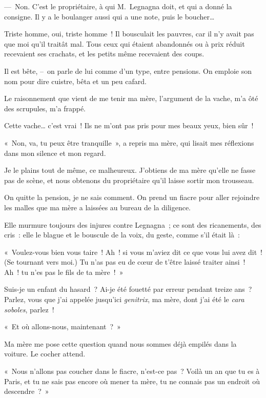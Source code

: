 \documentclass[french,twoside]{book} %
\begin{document}
— Non. C’est le propriétaire, à qui M. Legnagna doit, et qui a donné la consigne. Il y a le boulanger aussi qui a une note, puis le boucher…\par
Triste homme, oui, triste homme ! Il bousculait les pauvres, car il n’y avait pas que moi qu’il traitât mal. Tous ceux qui étaient abandonnés ou à prix réduit recevaient ses crachats, et les petits même recevaient des coups.\par
Il est bête, – on parle de lui comme d’un type, entre pensions. On emploie son nom pour dire cuistre, bêta et un peu cafard.\par
\bigbreak
\noindent Le raisonnement que vient de me tenir ma mère, l’argument de la vache, m’a ôté des scrupules, m’a frappé.\par
Cette vache… c’est vrai ! Ils ne m’ont pas pris pour mes beaux yeux, bien sûr !\par
« Non, va, tu peux être tranquille », a repris ma mère, qui lisait mes réflexions dans mon silence et mon regard.\par
\bigbreak
\noindent Je le plains tout de même, ce malheureux. J’obtiens de ma mère qu’elle ne fasse pas de scène, et nous obtenons du propriétaire qu’il laisse sortir mon trousseau.\par
On quitte la pension, je ne sais comment. On prend un fiacre pour aller rejoindre les malles que ma mère a laissées au bureau de la diligence.\par
Elle murmure toujours des injures contre Legnagna ; ce sont des ricanements, des cris : elle le blague et le bouscule de la voix, du geste, comme s’il était là :\par
« Voulez-vous bien vous taire ! Ah ! si vous m’aviez dit ce que vous lui avez dit ! (Se tournant vers moi.) Tu n’as pas eu de cœur de t’être laissé traiter ainsi ! Ah ! tu n’es pas le fils de ta mère ! »\par
Suis-je un enfant du hasard ? Ai-je été fouetté par erreur pendant treize ans ? Parlez, vous que j’ai appelée jusqu’ici \emph{genitrix}, ma mère, dont j’ai été le \emph{cara soboles}, parlez !\par
\bigbreak
\noindent « Et où allons-nous, maintenant ? »\par
Ma mère me pose cette question quand nous sommes déjà empilés dans la voiture. Le cocher attend.\par
« Nous n’allons pas coucher dans le fiacre, n’est-ce pas ? Voilà un an que tu es à Paris, et tu ne sais pas encore où mener ta mère, tu ne connais pas un endroit où descendre ? »\par
\end{document}
